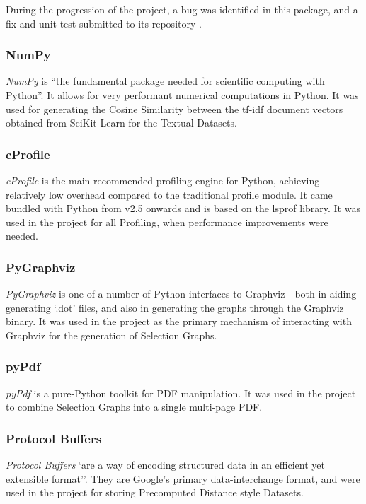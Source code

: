 \documentclass[a4paper,11pt]{report}
\begin{document}
During the progression of the project, a bug was identified in this package, and a fix and unit test submitted to its repository \citep{web:scikitpullreq}.

\subsubsection*{NumPy}
\emph{NumPy} \citep{prog:numpy} is ``the fundamental package needed for scientific computing with Python''. It allows for very performant numerical computations in Python. It was used for generating the Cosine Similarity between the tf-idf document vectors obtained from SciKit-Learn for the Textual Datasets.
 
\subsubsection*{cProfile}
\emph{cProfile} \citep{prog:cprofile} is the main recommended profiling engine for Python, achieving relatively low overhead compared to the traditional profile module. It came bundled with Python from v2.5 onwards and is based on the lsprof \citep{prog:lsprof} library. It was used in the project for all Profiling, when performance improvements were needed.

\subsubsection*{PyGraphviz}
\emph{PyGraphviz} \citep{prog:pygraphviz} is one of a number of Python interfaces to Graphviz - both in aiding generating `.dot' files, and also in generating the graphs through the Graphviz binary. It was used in the project as the primary mechanism of interacting with Graphviz for the generation of Selection Graphs. 

\subsubsection*{pyPdf}
\emph{pyPdf} \citep{prog:pypdf} is a pure-Python toolkit for PDF manipulation. It was used in the project to combine Selection Graphs into a single multi-page PDF.

\subsubsection*{Protocol Buffers}
\emph{Protocol Buffers} \citep{prog:protocolbuffers} `are a way of encoding structured data in an efficient yet extensible format''. They are Google's primary data-interchange format, and were used in the project for storing Precomputed Distance style Datasets.
\end{document}
